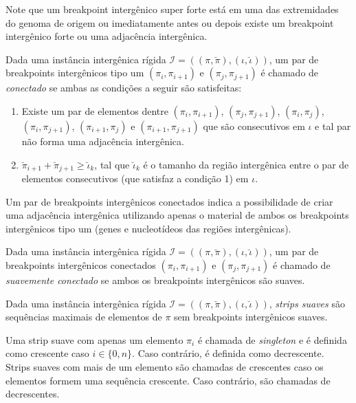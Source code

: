 Note que um breakpoint intergênico super forte está em uma das extremidades do genoma de origem ou imediatamente antes ou depois existe um breakpoint intergênico forte ou uma adjacência intergênica.

\begin{definition}
  Dada uma instância intergênica rígida $\mathcal{I} = ((\pi,\breve\pi),(\iota,\breve\iota))$, um par de breakpoints intergênicos tipo um $(\pi_{i},\pi_{i+1})$ e $(\pi_{j},\pi_{j+1})$ é chamado de \emph{conectado} se ambas as condições a seguir são satisfeitas:
  \begin{enumerate}
    \item Existe um par de elementos dentre $(\pi_{i},\pi_{i+1})$, $(\pi_{j},\pi_{j+1})$, $(\pi_{i},\pi_{j})$, $(\pi_{i},\pi_{j+1})$, $(\pi_{i+1},\pi_{j})$ e $(\pi_{i+1},\pi_{j+1})$ que são consecutivos em $\iota$ e tal par não forma uma adjacência intergênica.
    \item $\breve\pi_{i+1} + \breve\pi_{j+1} \ge \breve\iota_{k}$, tal que $\breve\iota_{k}$ é o tamanho da região intergênica entre o par de elementos consecutivos (que satisfaz a condição 1) em $\iota$.
  \end{enumerate}
\end{definition}

Um par de breakpoints intergênicos conectados indica a possibilidade de criar uma adjacência intergênica utilizando apenas o material de ambos os breakpoints intergênicos tipo um (genes e nucleotídeos das regiões intergênicas).

\begin{definition}
Dada uma instância intergênica rígida $\mathcal{I} = ((\pi,\breve\pi),(\iota,\breve\iota))$, um par de breakpoints intergênicos conectados $(\pi_{i},\pi_{i+1})$ e $(\pi_{j},\pi_{j+1})$ é chamado de \emph{suavemente conectado} se ambos os breakpoints intergênicos são suaves.
\end{definition}

\begin{definition}
  Dada uma instância intergênica rígida $\mathcal{I} = ((\pi,\breve\pi),(\iota,\breve\iota))$, \emph{strips suaves} são sequências maximais de elementos de $\pi$ sem breakpoints intergênicos suaves.
\end{definition}

Uma strip suave com apenas um elemento $\pi_i$ é chamada de \emph{singleton} e é definida como crescente caso  $i \in \{0,n\}$. Caso contrário, é definida como decrescente. Strips suaves com mais de um elemento são chamadas de crescentes caso os elementos formem uma sequência crescente. Caso contrário, são chamadas de decrescentes.

